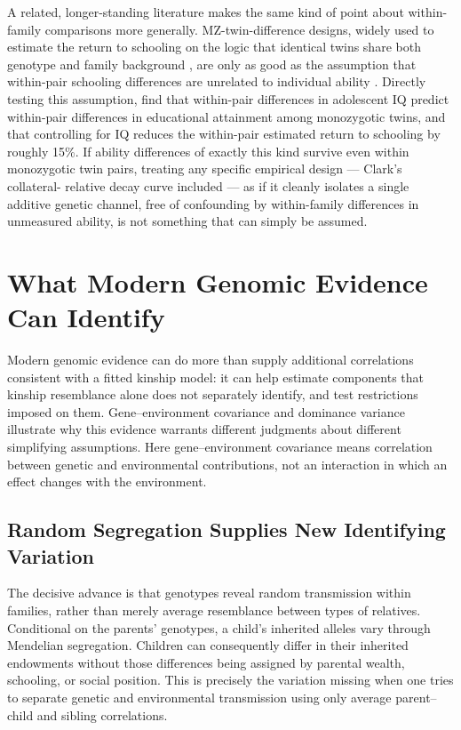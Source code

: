 \documentclass[12pt]{article}
\begin{document}
A related, longer-standing literature makes the same kind of point about
within-family comparisons more generally. MZ-twin-difference designs, widely
used to estimate the return to schooling on the logic that identical twins
share both genotype and family background \citep{Griliches1979}, are only as
good as the assumption that within-pair schooling differences are unrelated
to individual ability \citep{Griliches1977,BoundSolon1999,Neumark1999}.
Directly testing this assumption, \citet{SandewallEtAl2014} find that
within-pair differences in adolescent IQ predict within-pair differences in
educational attainment among monozygotic twins, and that controlling for IQ
reduces the within-pair estimated return to schooling by roughly 15\%. If
ability differences of exactly this kind survive even within monozygotic
twin pairs, treating any specific empirical design --- Clark's collateral-
relative decay curve included --- as if it cleanly isolates a single
additive genetic channel, free of confounding by within-family differences
in unmeasured ability, is not something that can simply be assumed.

\section{What Modern Genomic Evidence Can Identify}
\label{sec:genomic-evidence}

Modern genomic evidence can do more than supply additional correlations
consistent with a fitted kinship model: it can help estimate components
that kinship resemblance alone does not separately identify, and test
restrictions imposed on them. Gene--environment covariance and dominance
variance illustrate why this evidence warrants different judgments about
different simplifying assumptions. Here gene--environment covariance
means correlation between genetic and environmental contributions, not
an interaction in which an effect changes with the environment.

\subsection{Random Segregation Supplies New Identifying Variation}

The decisive advance is that genotypes reveal random transmission within
families, rather than merely average resemblance between types of relatives.
Conditional on the parents' genotypes, a child's inherited alleles vary
through Mendelian segregation. Children can consequently differ in their
inherited endowments without those differences being assigned by parental
wealth, schooling, or social position. This is precisely the variation
missing when one tries to separate genetic and environmental transmission
using only average parent--child and sibling correlations.
\end{document}
